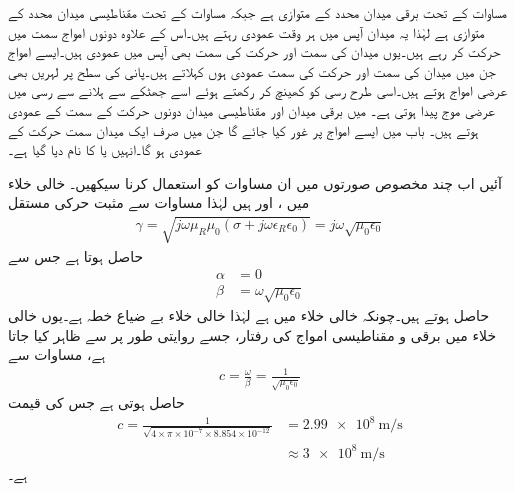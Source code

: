 مساوات  کے تحت برقی میدان  محدد کے متوازی ہے جبکہ مساوات  کے تحت مقناطیسی میدان  محدد کے متوازی ہے لہٰذا یہ میدان  آپس میں ہر وقت عمودی رہتے ہیں۔اس کے علاوہ دونوں امواج  سمت میں حرکت کر رہے ہیں۔یوں میدان کی سمت اور حرکت کی سمت بھی آپس میں عمودی ہیں۔ایسے امواج جن میں میدان کی سمت اور حرکت کی سمت عمودی ہوں  کہلاتے ہیں۔پانی کی سطح پر لہریں بھی عرضی امواج ہوتے ہیں۔اسی طرح رسی کو کھینچ کر رکھتے ہوئے اسے جھٹکے  سے ہلانے سے  رسی میں عرضی موج پیدا ہوتی ہے۔ میں برقی میدان اور مقناطیسی میدان دونوں حرکت کے سمت کے عمودی ہوتے ہیں۔ باب  میں ایسے امواج پر غور کیا جائے گا جن میں صرف ایک میدان سمت حرکت کے عمودی ہو گا۔انہیں  یا  کا نام دیا گیا ہے۔ 

آئیں اب چند مخصوص صورتوں میں ان مساوات کو استعمال کرنا سیکھیں۔
خالی خلاء میں ،  اور   ہیں لہٰذا مساوات  سے مثبت حرکی مستقل
\begin{align*}
\gamma=\sqrt{j \omega \mu_R \mu_0  \left(\sigma +j \omega \epsilon_R \epsilon_0 \right)}=j \omega \sqrt{\mu_0 \epsilon_0}
\end{align*}
حاصل ہوتا ہے جس سے
\begin{align*}
\alpha&=0\\
\beta&=\omega \sqrt{\mu_0 \epsilon_0}
\end{align*}
حاصل ہوتے ہیں۔چونکہ خالی خلاء میں   ہے لہٰذا خالی خلاء بے ضیاع خطہ ہے۔یوں خالی خلاء میں برقی و مقناطیسی امواج کی رفتار، جسے روایتی طور پر  سے ظاہر کیا جاتا ہے،  مساوات  سے
\begin{align}
c=\frac{\omega}{\beta}=\frac{1}{\sqrt{\mu_0 \epsilon_0}}
\end{align}
حاصل ہوتی ہے جس کی قیمت
\begin{align*}
c=\frac{1}{\sqrt{4 \times \pi \times 10^{-7} \times 8.854 \times 10^{-12}}}&=\SI{2.99e8}{\meter \per \second} \\
&\approx \SI{3e8}{\meter \per \second}
\end{align*}
ہے۔

